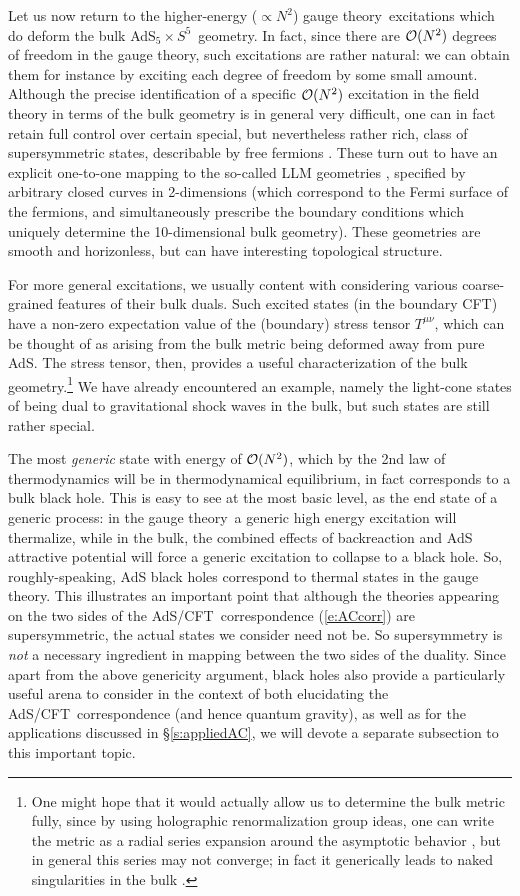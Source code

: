 \documentclass[12pt]{article}
\def\sect#1{\S\ref{#1}}
\def\req#1{(\ref{#1})}
\def\AC{AdS/CFT}
\def\GT{gauge theory}
\def\QG{quantum gravity}
\def\adss#1#2{AdS$_{#1} \times S^{#2}$}
\begin{document}
Let us now return to the higher-energy ($\propto N^2$) \GT\ excitations which do deform the bulk \adss55\ geometry.  In fact, since there are ${\cal O}(N^2)$ degrees of freedom in the \GT, such excitations are rather natural: we can obtain them for instance by exciting each degree of freedom by some small amount.
Although the precise identification of a specific ${\cal O}(N^2)$ excitation in the field theory in terms of the bulk geometry is in general very difficult, one can in fact retain full control over certain  special, but nevertheless rather rich, class of supersymmetric states, describable by free fermions \cite{Berenstein:2004kk,Corley:2001zk}.  These turn out to have an explicit one-to-one mapping to the so-called LLM geometries \cite{Lin:2004nb}, specified by arbitrary closed curves in 2-dimensions (which correspond to the Fermi surface of the fermions, and simultaneously prescribe the boundary conditions which uniquely determine the 10-dimensional bulk geometry).  These geometries are smooth and horizonless, but can have interesting topological structure.

For more general excitations, we usually content with considering various coarse-grained features of their bulk duals.  Such excited states (in the boundary CFT) have a non-zero expectation value of the (boundary) stress tensor $T^{\mu\nu}$, which can be thought of as arising from the bulk metric being deformed away from pure AdS. The stress tensor, then, provides a useful characterization of the bulk geometry.\footnote{
One might hope that it would actually allow us to determine the bulk metric fully, since by using holographic renormalization group ideas, one can write the metric as a radial series expansion around the asymptotic behavior \cite{deHaro:2000xn}, but in general this series may not converge; in fact it generically leads to naked singularities in the bulk \cite{Bhattacharyya:2008jc}.
}  We have already encountered an example, namely the light-cone states of \cite{Horowitz:1999gf} being dual to gravitational shock waves in the bulk, but such states are still rather special.  

The most {\it generic} state with energy of ${\cal O}(N^2)$, which by the 2nd law of thermodynamics will be in thermodynamical equilibrium, in fact corresponds to a bulk black hole.  This is easy to see at the most basic level, as the end state of a generic process: in the \GT\ a generic high energy excitation will thermalize, while in the bulk, the combined effects of backreaction and AdS attractive potential will force a generic excitation to collapse to a black hole.
So, roughly-speaking, AdS black holes correspond to thermal states in the \GT.  This illustrates an important point that although the theories appearing on the two sides of the \AC\ correspondence \req{e:ACcorr} are supersymmetric, the actual  states we consider need not be.  So supersymmetry is {\it not} a necessary ingredient in mapping between the two sides of the duality.
Since apart from the above genericity argument, black holes also provide  a particularly useful arena to consider in the context of both elucidating the \AC\ correspondence (and hence \QG), as well as for the applications discussed in \sect{s:appliedAC}, we will devote a separate subsection to this important topic.  
\end{document}
